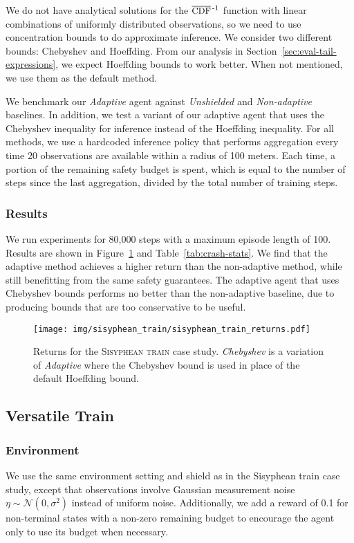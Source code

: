We do not have analytical solutions for the $\InvCCDF$ function with linear combinations of uniformly distributed observations, so we need to use concentration bounds to do approximate inference. We consider two different bounds: Chebyshev and Hoeffding. From our analysis in Section~\ref{sec:eval-tail-expressions}, we expect Hoeffding bounds to work better. When not mentioned, we use them as the default method.

We benchmark our \emph{Adaptive} agent against \emph{Unshielded} and \emph{Non-adaptive} baselines. In addition, we test a variant of our adaptive agent that uses the Chebyshev inequality for inference instead of the Hoeffding inequality. For all methods, we use a hardcoded inference policy that performs aggregation every time 20 observations are available within a radius of 100 meters. Each time, a portion of the remaining safety budget is spent, which is equal to the number of steps since the last aggregation, divided by the total number of training steps. %

\subsubsection{Results} We run experiments for 80,000 steps with a maximum episode length of 100. Results are shown in Figure~\ref{fig:example1-1} and Table~\ref{tab:crash-stats}. We find that the adaptive method achieves a higher return than the non-adaptive method, while still benefitting from the same safety guarantees. The adaptive agent that uses Chebyshev bounds performs no better than the non-adaptive baseline, due to producing bounds that are too conservative to be useful.

\begin{figure}
    \texttt{[image: img/sisyphean\_train/sisyphean\_train\_returns.pdf]}
    \caption{Returns for the \textsc{Sisyphean train} case study. \emph{Chebyshev} is a variation of \emph{Adaptive} where the Chebyshev bound is used in place of the default Hoeffding bound.}
    \label{fig:example1-1}
    \Description[]{}
\end{figure}

\subsection{Versatile Train}\label{ap:versatile-train}

\subsubsection{Environment} We use the same environment setting and shield as in the Sisyphean train case study, except that observations involve Gaussian measurement noise $\eta \sim \mathcal{N}(0, \sigma^2)$ instead of uniform noise. Additionally, we add a reward of 0.1 for non-terminal states with a non-zero remaining budget to encourage the agent only to use its budget when necessary.


